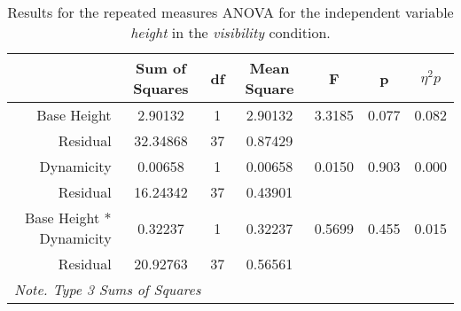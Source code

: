 \begin{table*}[ht]
    \centering
    \caption{Results for the repeated measures ANOVA for the independent variable \textit{height} in the \textit{visibility} condition.}
    \begin{tabular}{r|cccccc}
    \toprule
                                  & \textbf{Sum of Squares} & \textbf{df} & \textbf{Mean Square} & \textbf{F} & \textbf{p} & \textbf{$\eta^2p$} \\
    \midrule
    Base Height                   & 2.90132                 & 1           & 2.90132              & 3.3185     & 0.077      & 0.082              \\
    Residual                      & 32.34868                & 37          & 0.87429              &            &            &                    \\
    Dynamicity                    & 0.00658                 & 1           & 0.00658              & 0.0150     & 0.903      & 0.000              \\
    Residual                      & 16.24342                & 37          & 0.43901              &            &            &                    \\
    Base Height * Dynamicity      & 0.32237                 & 1           & 0.32237              & 0.5699     & 0.455      & 0.015              \\
    Residual                      & 20.92763                & 37          & 0.56561              &            &            &                    \\
    \bottomrule
    \multicolumn{7}{l}{\textit{Note. Type 3 Sums of Squares}}                                                                                                                                                                                                  
    \end{tabular}
\end{table*}

